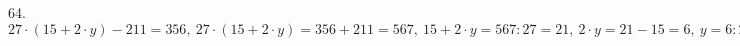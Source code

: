 64. $27\cdot(15+2\cdot y)-211=356,\ 27\cdot(15+2\cdot y)=356+211=567,\ 15+2\cdot y=567:27=21,\ 2\cdot y=21-15=6,\ y=6:2=3.$\\
